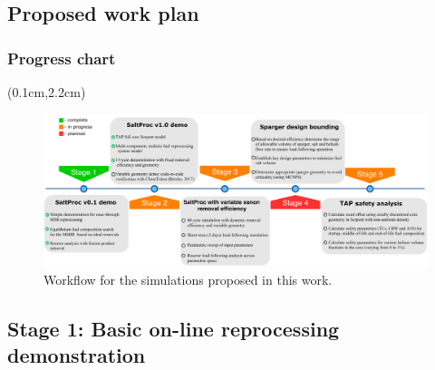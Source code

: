 \subsection{Proposed work plan}

\begin{frame}
  \frametitle{Progress chart}       
  	  \begin{textblock*}{12.5cm}(0.1cm,2.2cm) %
 \begin{figure}[ht!] %
	\includegraphics[width=\textwidth]{./images/progress_chart.pdf} 
	\caption{Workflow for the simulations proposed in this work.}
\end{figure}
		\end{textblock*}
\end{frame}


\subsection{Stage 1: Basic on-line reprocessing demonstration}

